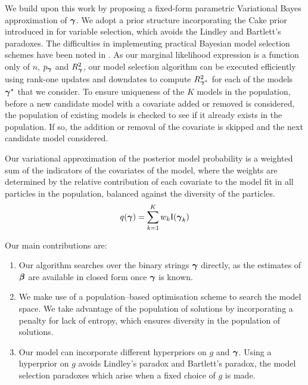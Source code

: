 We build upon this work by proposing a fixed-form parametric Variational Bayes
approximation of ${\boldsymbol \gamma}$. We adopt a prior structure incorporating the Cake
prior introduced in \cite{OrmerodEtal2017} for variable selection, which avoids
the Lindley and Bartlett's paradoxes. The difficulties in implementing
practical Bayesian model selection schemes have been noted in
\cite{Chipman2014}. As our marginal likelihood expression is a function only of
$n$, $p_{\boldsymbol \gamma}$ and $R^2_{\boldsymbol \gamma}$, our model selection algorithm can be
executed efficiently using rank-one updates and downdates to compute
$R^2_{{\boldsymbol \gamma}^*}$ for each of the models ${\boldsymbol \gamma}^*$ that we consider. To
ensure uniqueness of the $K$ models in the population, before a new candidate
model with a covariate added or removed is considered, the population of
existing models is checked to see if it already exists in the population. If
so, the addition or removal of the covariate is skipped and the next candidate
model considered.

Our variational approximation of the posterior model probability is a weighted
sum of the indicators of the covariates of the model, where the weights are
determined by the relative contribution of each covariate to the model fit in
all particles in the population, balanced against the diversity of the
particles.
\[
	q({\boldsymbol \gamma}) = \sum_{k=1}^K w_k \text{I}({\boldsymbol \gamma}_k)
\]


Our main contributions are:

\begin{enumerate}
    \item Our algorithm searches over the binary strings ${\boldsymbol \gamma}$ directly, as
        the estimates of ${\boldsymbol \beta}$ are available in closed form once ${\boldsymbol \gamma}$
        is known.

    \item We make use of a population--based optimisation scheme to search the
        model space. We take advantage of the population of solutions by
        incorporating a penalty for lack of entropy, which ensures diversity in
        the population of solutions.


    \item Our model can incorporate different hyperpriors on $g$ and ${\boldsymbol \gamma}$.
Using a hyperprior on $g$ avoids Lindley's paradox and Bartlett's paradox, the
model selection paradoxes which arise when a fixed choice of $g$ is made.
\end{enumerate}

